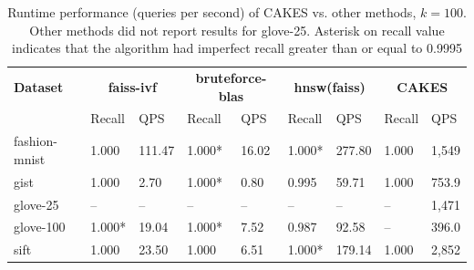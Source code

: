 \begin{table}[!t]
    \caption{Runtime performance (queries per second) of CAKES vs. other methods, $k=100$. Other methods did not report results for glove-25. Asterisk on recall value indicates that the algorithm had imperfect recall greater than or equal to 0.9995}
    \label{table:results:ann-100}
    \vskip 0.15in
    \begin{center}
    \begin{small}
    \begin{sc}
    \begin{tabular}{|l|p{1cm}|p{1cm}|p{1cm}|p{1cm}|p{1cm}|p{1cm}|p{1cm}|p{1cm}|}
    \textbf{Dataset}  & \multicolumn{2}{|c|}{\textbf{faiss-ivf}} & \multicolumn{2}{|c|}{\textbf{bruteforce-blas}} & \multicolumn{2}{|c|}{\textbf{hnsw(faiss)}} & \multicolumn{2}{|c|}{\textbf{CAKES}} \\
    &                    Recall & QPS                           & Recall & QPS                           & Recall & QPS                                           & Recall & QPS \\
    \hline
    fashion-mnist         & 1.000 & 111.47                           & 1.000* & 16.02                                  & 1.000* & 277.80                                                    & 1.000 & 1,549 \\ 
    \hline
    gist                   & 1.000 & 2.70                           & 1.000* & 0.80                                 & 0.995 & 59.71                                                    & 1.000 & 753.9 \\
    \hline
    glove-25              & -- & --                                & -- & --                                & -- & --                                                    & -- & 1,471 \\
    \hline
    glove-100             & 1.000* &  19.04                          & 1.000* & 7.52                                 & 0.987 & 92.58                                                    & -- & 396.0 \\
    \hline
    sift                  & 1.000 &  23.50                          & 1.000 & 6.51                                  & 1.000* & 179.14                                                    & 1.000 & 2,852 \\                                                 
    \hline
    \end{tabular}
    \end{sc}
    \end{small}
    \end{center}
    \vskip -0.1in
    \end{table}


